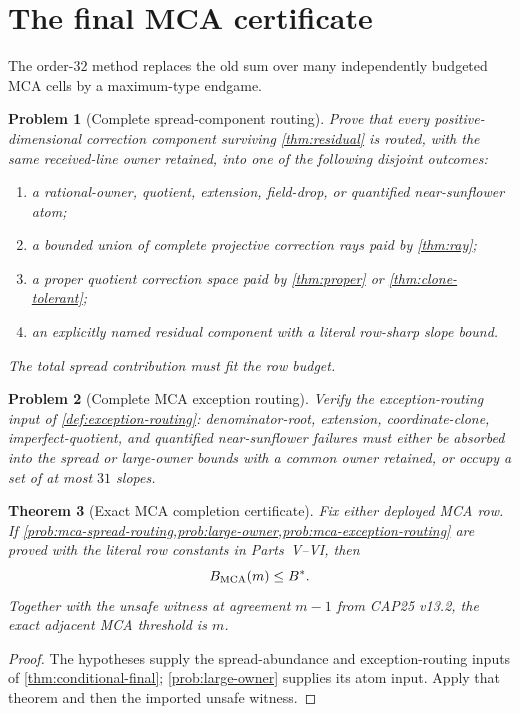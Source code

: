 \documentclass[11pt,a4paper]{amsart}
\numberwithin{equation}{section}
\newtheorem{theorem}{Theorem}[section]
\newtheorem{problem}[theorem]{Problem}
\theoremstyle{remark}
\begin{document}
\section{The final MCA certificate}
\label{sec:mca-final-certificate}
The order-$32$ method replaces the old sum over many independently budgeted MCA cells by a maximum-type endgame.

\begin{problem}[Complete spread-component routing]\label{prob:mca-spread-routing}
Prove that every positive-dimensional correction component surviving \cref{thm:residual} is routed, with the same received-line owner retained, into one of the following disjoint outcomes:
\begin{enumerate}[label=\textup{(\alph*)}]
\item a rational-owner, quotient, extension, field-drop, or quantified near-sunflower atom;
\item a bounded union of complete projective correction rays paid by \cref{thm:ray};
\item a proper quotient correction space paid by \cref{thm:proper} or \cref{thm:clone-tolerant};
\item an explicitly named residual component with a literal row-sharp slope bound.
\end{enumerate}
The total spread contribution must fit the row budget.
\end{problem}

\begin{problem}[Complete MCA exception routing]\label{prob:mca-exception-routing}
Verify the exception-routing input of \cref{def:exception-routing}: denominator-root, extension, coordinate-clone, imperfect-quotient, and quantified near-sunflower failures must either be absorbed into the spread or large-owner bounds with a common owner retained, or occupy a set of at most $31$ slopes.
\end{problem}

\begin{theorem}[Exact MCA completion certificate]\label{thm:mca-completion-certificate}
Fix either deployed MCA row.  If \cref{prob:mca-spread-routing,prob:large-owner,prob:mca-exception-routing} are proved with the literal row constants in Parts~V--VI, then
\[
 B_{\rm MCA}(m)\le B^*.
\]
Together with the unsafe witness at agreement $m-1$ from CAP25 v13.2, the exact adjacent MCA threshold is $m$.
\end{theorem}

\begin{proof}
The hypotheses supply the spread-abundance and exception-routing inputs of \cref{thm:conditional-final}; \cref{prob:large-owner} supplies its atom input.  Apply that theorem and then the imported unsafe witness.
\end{proof}
\end{document}
